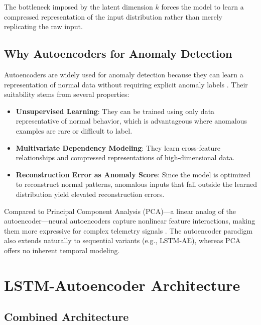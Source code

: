 The bottleneck imposed by the latent dimension $k$ forces the model to learn a
compressed representation of the input distribution rather than merely replicating the
raw input.

\subsection{Why Autoencoders for Anomaly Detection}
\label{subsec:ae_why}

Autoencoders are widely used for anomaly detection because they can learn a
representation of normal data without requiring explicit anomaly labels
\cite{chalapathy2019deep, pang2021deep}. Their suitability stems from several
properties:

\begin{itemize}
    \item \textbf{Unsupervised Learning}: They can be trained using only data
    representative of normal behavior, which is advantageous where anomalous examples
    are rare or difficult to label.

    \item \textbf{Multivariate Dependency Modeling}: They learn cross-feature
    relationships and compressed representations of high-dimensional data.

    \item \textbf{Reconstruction Error as Anomaly Score}: Since the model is optimized
    to reconstruct normal patterns, anomalous inputs that fall outside the learned
    distribution yield elevated reconstruction errors.
\end{itemize}

Compared to Principal Component Analysis (PCA)---a linear analog of the
autoencoder---neural autoencoders capture nonlinear feature interactions, making them
more expressive for complex telemetry signals \cite{jolliffe2016pca, chalapathy2019deep}.
The autoencoder paradigm also extends naturally to sequential variants (e.g., LSTM-AE),
whereas PCA offers no inherent temporal modeling.

\section{LSTM-Autoencoder Architecture}
\label{sec:lstm_ae}

\subsection{Combined Architecture}
\label{subsec:lstm_ae_architecture}

